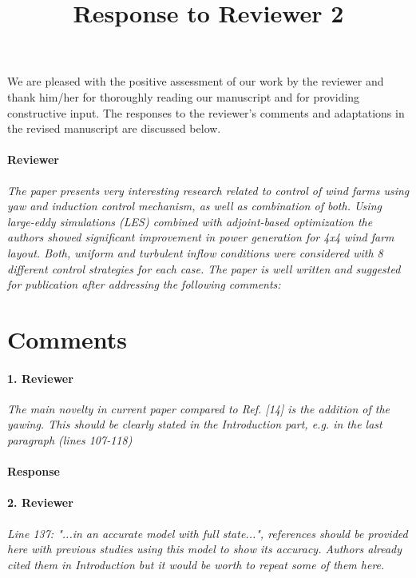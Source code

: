 \documentclass[]{article}
\title{Response to Reviewer 2}
\author{}
\date{}
\begin{document}
\maketitle

We are pleased with the positive assessment of our work by the reviewer and thank him/her for thoroughly reading our manuscript and for providing constructive input. The responses to the reviewer's comments and adaptations in the revised manuscript are discussed below.

\hrulefill

\paragraph{Reviewer} \textit{The paper presents very interesting research related to control of wind farms using yaw and induction control mechanism, as well as combination of both. Using large-eddy simulations (LES) combined with adjoint-based optimization the authors showed significant improvement in power generation for 4x4 wind farm layout. Both, uniform and turbulent inflow conditions were considered with 8 different control strategies for each case. The paper is well written and suggested for publication after addressing the following comments:}


\section*{Comments}
\hrulefill

\paragraph{1. Reviewer} \textit{The main novelty in current paper compared to Ref. [14] is the addition of the yawing. This should be clearly stated in the Introduction part, e.g. in the last paragraph (lines 107-118)}

\paragraph{Response} 

\hrulefill

\paragraph{2. Reviewer} \textit{Line 137: "...in an accurate model with full state...", references should be provided here with previous studies using this model to show its accuracy. Authors already cited them in Introduction but it would be worth to repeat some of them here.}
\end{document}
